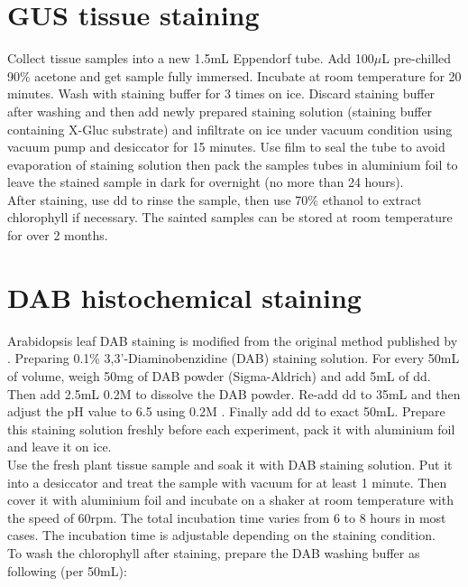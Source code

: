 \section{GUS tissue staining}
Collect tissue samples into a new 1.5mL Eppendorf tube. Add 100$\mu$L pre-chilled 90\% acetone and get sample fully immersed. Incubate at room temperature for 20 minutes. Wash with staining buffer for 3 times on ice. Discard staining buffer after washing and then add newly prepared staining solution (staining buffer containing X-Gluc substrate) and infiltrate on ice under vacuum condition using vacuum pump and desiccator for 15 minutes. Use film to seal the tube to avoid evaporation of staining solution then pack the samples tubes in aluminium foil to leave the stained sample in dark for overnight (no more than 24 hours).\\
\linebreak
After staining, use dd to rinse the sample, then use 70\% ethanol to extract chlorophyll if necessary. The sainted samples can be stored at room temperature for over 2 months.\\

\section{DAB histochemical staining}
Arabidopsis leaf DAB staining is modified from the original method published by \cite{daudi2012detection}. Preparing 0.1\% 3,3'-Diaminobenzidine (DAB) staining solution. For every 50mL of volume, weigh 50mg of DAB powder (Sigma-Aldrich) and add 5mL of dd. Then add 2.5mL 0.2M  to dissolve the DAB powder. Re-add dd to 35mL and then adjust the pH value to 6.5 using 0.2M . Finally add dd to exact 50mL. Prepare this staining solution freshly before each experiment, pack it with aluminium foil and leave it on ice.\\
\linebreak
Use the fresh plant tissue sample and soak it with DAB staining solution. Put it into a desiccator and treat the sample with vacuum for at least 1 minute. Then cover it with aluminium foil and incubate on a shaker at room temperature with the speed of 60rpm. The total incubation time varies from 6 to 8 hours in most cases. The incubation time is adjustable depending on the staining condition.\\
\linebreak
To wash the chlorophyll after staining, prepare the DAB washing buffer as following (per 50mL):\\

